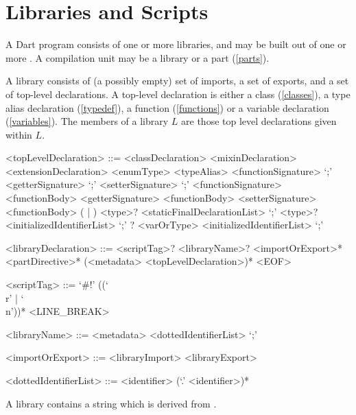 \documentclass[makeidx]{article}
\begin{document}
{\section{Libraries and Scripts}

\LMHash{}%
A Dart program consists of one or more libraries,
and may be built out of one or more .
A compilation unit may be a library or a part (\ref{parts}).

\LMHash{}%
A library consists of (a possibly empty) set of imports, a set of exports,
and a set of top-level declarations.
A top-level declaration is either a class (\ref{classes}),
a type alias declaration (\ref{typedef}),
a function (\ref{functions})
or a variable declaration (\ref{variables}).
The members of a library $L$ are those top level declarations given within $L$.

\begin{grammar}
<topLevelDeclaration> ::= <classDeclaration>
  \alt <mixinDeclaration>
  \alt <extensionDeclaration>
  \alt <enumType>
  \alt <typeAlias>
  \alt \EXTERNAL{} <functionSignature> `;'
  \alt \EXTERNAL{} <getterSignature> `;'
  \alt \EXTERNAL{} <setterSignature> `;'
  \alt <functionSignature> <functionBody>
  \alt <getterSignature> <functionBody>
  \alt <setterSignature> <functionBody>
  \alt (\FINAL{} | \CONST{}) <type>? <staticFinalDeclarationList> `;'
  \alt \LATE{} \FINAL{} <type>? <initializedIdentifierList> `;'
  \alt \LATE? <varOrType> <initializedIdentifierList> `;'

<libraryDeclaration> ::= \gnewline{}
  <scriptTag>? <libraryName>? <importOrExport>* <partDirective>*
  \gnewline{} (<metadata> <topLevelDeclaration>)* <EOF>

<scriptTag> ::= `#!' (\gtilde(`\\r' | `\\n'))* <LINE\_BREAK>

<libraryName> ::= <metadata> \LIBRARY{} <dottedIdentifierList> `;'

<importOrExport> ::= <libraryImport>
  \alt <libraryExport>

<dottedIdentifierList> ::= <identifier> (`.' <identifier>)*
\end{grammar}

\LMHash{}%
A library contains a string which is derived from .


}
\end{document}
